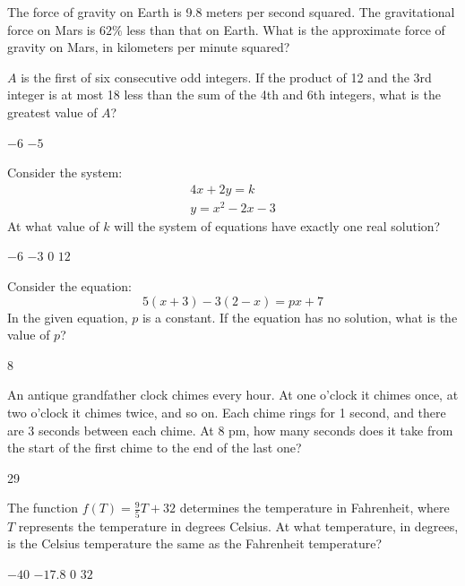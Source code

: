 \question[1]
The force of gravity on Earth is 9.8 meters per second squared. The gravitational force on Mars is $62\%$ less than that on Earth. What is the approximate force of gravity on Mars, in kilometers per minute squared?
\begin{choices}
\end{choices}

\question[1]
$A$ is the first of six consecutive odd integers. If the product of 12 and the 3rd integer is at most 18 less than the sum of the 4th and 6th integers, what is the greatest value of $A$?
\begin{choices}
  \choice $-6$
  \CorrectChoice $-5$
\end{choices}

\question[1]
Consider the system:
\[
  \begin{gathered}
  4x + 2y = k \\
  y = x^2 - 2x - 3
  \end{gathered}
\]
At what value of $k$ will the system of equations have exactly one real solution?
\begin{choices}
  \CorrectChoice $-6$
  \choice $-3$
  \choice $0$
  \choice $12$
\end{choices}



\newpage




\question[1]
Consider the equation:
\[
  5(x+3) - 3(2-x) = p x + 7
\]
In the given equation, $p$ is a constant. If the equation has no solution, what is the value of $p$?
\begin{solution}
8
\end{solution}

\question[1]
An antique grandfather clock chimes every hour. At one o'clock it chimes once, at two o'clock it chimes twice, and so on. Each chime rings for 1 second, and there are 3 seconds between each chime. At 8 pm, how many seconds does it take from the start of the first chime to the end of the last one?
\begin{solution}
29
\end{solution}

\question[1]
The function $f(T) = \frac{9}{5}T + 32$ determines the temperature in Fahrenheit, where $T$ represents the temperature in degrees Celsius. At what temperature, in degrees, is the Celsius temperature the same as the Fahrenheit temperature?
\begin{choices}
  \CorrectChoice $-40$
  \choice $-17.8$
  \choice $0$
  \choice $32$
\end{choices}



